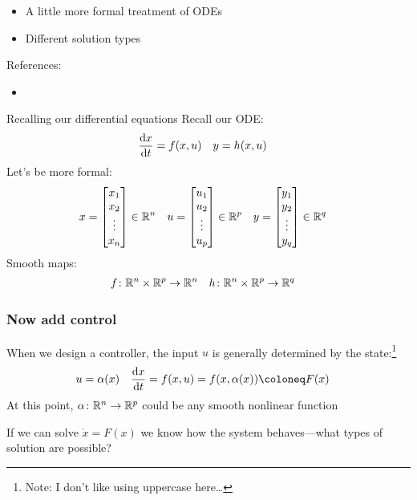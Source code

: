 \documentclass{beamer-control}
\begin{document}

\begin{SUMMARY}
\begin{itemize}
\item A little more formal treatment of ODEs
\item Different solution types 
\end{itemize}
\vfill References:
\begin{itemize}
\item {}
\end{itemize}
\end{SUMMARY}



\begin{frame}{Recalling our differential equations}
Recall our ODE:
\begin{align}
\frac{\mathrm{d} x}{\mathrm{d} t} &= f(x,u) & y &= h(x,u)
\end{align}
Let's be more formal:
\begin{align}
x &= \begin{bmatrix}x_1\\x_2\\\vdots\\x_n\end{bmatrix} \in \mathbb{R}^n & 
u &= \begin{bmatrix}u_1\\u_2\\\vdots\\u_p\end{bmatrix} \in \mathbb{R}^p & 
y &= \begin{bmatrix}y_1\\y_2\\\vdots\\y_q\end{bmatrix} \in \mathbb{R}^q 
\end{align}
Smooth maps:
\begin{align}
f&\colon\mathbb{R}^n \times \mathbb{R}^p \to \mathbb{R}^n &
h&\colon\mathbb{R}^n \times \mathbb{R}^p \to \mathbb{R}^q
\end{align}
\end{frame}

\begin{frame}
\frametitle{Now add control}
When we design a controller, the input $u$ is generally determined by the state:\footnote{Note: I don't like using uppercase here\dots}
\begin{align}
u &= \alpha(x) & \Deriv{x}{t} &= f(x,u) = f(x,\alpha(x)) \coloneq F(x) \label{eq:Fx}
\end{align}
At this point, $\alpha\colon\mathbb{R}^n \to \mathbb{R}^p$ could be any smooth nonlinear function 
\bigskip

If we can solve $\dot x=F(x)$ we know how the system behaves---what types of solution are possible?
\end{frame}
\end{document}
